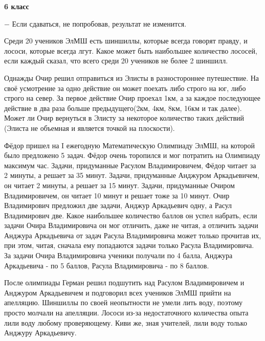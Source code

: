 \hspace{3mm}

\centerline{\bf \huge 6 класс}

\begin{flushright}
    \scriptsize{ $-$ Если сдаваться, не попробовав, результат не изменится.}
\end{flushright}

 Среди 20 учеников ЭлМШ есть шиншиллы, которые всегда говорят правду, и лососи, которые всегда лгут. Какое может быть наибольшее количество лососей, если каждый сказал, что всего среди 20 учеников не более 2 шиншилл.

\hspace{3mm}

 Однажды Очир решил отправиться из Элисты в разностороннее путешествие. На своё усмотрение за одно действие он может поехать либо строго на юг, либо строго на север. За первое действие Очир проехал 1км, а за каждое последующее действие в два раза больше предыдущего(2км, 4км, 8км, 16км и так далее). Может ли Очир вернуться в Элисту за некоторое количество таких действий (Элиста не объемная и является точкой на плоскости).


\hspace{3mm}


 Фёдор пришел на I ежегодную Математическую Олимпиаду ЭлМШ, на которой было предложено 5 задач. Фёдор очень торопился и мог потратить на Олимпиаду максимум час. Задачи, придуманные Расулом Владимировичем, Фёдор читает за 2 минуты, а решает за 35 минут. Задачи, придуманные Анджуром Аркадьевичем, он читает 2 минуты, а решает за 15 минут. Задачи, придуманные Очиром Владимировичем, он читает 10 минут и решает тоже за 10 минут. Очир Владимирович предложил две задачи, Анджур Аркадьевич одну, а Расул Владимирович две. Какое наибольшее количество баллов он успел набрать, если задачи Очира Владимировича он мог отличить, даже не читая, а отличить задачи Анджура Аркадьевича от задач Расула Владимировича может только прочитав их, при этом, читая, сначала ему попадаются задачи только Расула Владимировича. За задачи Очира Владимировича ученики получали по 4 балла, Анджура Аркадьевича - по 5 баллов, Расула Владимировича - по 8 баллов.

\hspace{3mm}


 После олимпиады Герман решил подшутить над Расулом Владимировичем и Анджуром Аркадьевичем и подговорил всех учеников ЭлМШ прийти на апелляцию. Шиншиллы по своей неопытности не умели лить воду, поэтому просто молчали на апелляции. Лососи из-за недостаточного количества опыта лили воду любому проверяющему. Киви же, зная учителей, лили воду только Анджуру Аркадьевичу. 

